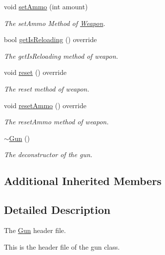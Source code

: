 \begin{DoxyCompactItemize}
\item 
void \hyperlink{class_gun_a32ff9325061ddab247a5d726d8f98207}{set\+Ammo} (int amount)
\begin{DoxyCompactList}\small\item\em The set\+Ammo Method of \hyperlink{class_weapon}{Weapon}. \end{DoxyCompactList}\item 
bool \hyperlink{class_gun_af74d11f4e7f839f4a5842557caeecd64}{get\+Is\+Reloading} () override
\begin{DoxyCompactList}\small\item\em The get\+Is\+Reloading method of weapon. \end{DoxyCompactList}\item 
void \hyperlink{class_gun_adda4a40faac31a145d132ff88002ea20}{reset} () override
\begin{DoxyCompactList}\small\item\em The reset method of weapon. \end{DoxyCompactList}\item 
void \hyperlink{class_gun_aa9b43a5d5d47f8d4c09689fbf4ae84c3}{reset\+Ammo} () override
\begin{DoxyCompactList}\small\item\em The reset\+Ammo method of weapon. \end{DoxyCompactList}\item 
\hyperlink{class_gun_af107f78d608720fef712c14b148afcdd}{$\sim$\+Gun} ()
\begin{DoxyCompactList}\small\item\em The deconstructor of the gun. \end{DoxyCompactList}\end{DoxyCompactItemize}
\subsection*{Additional Inherited Members}


\subsection{Detailed Description}
The \hyperlink{class_gun}{Gun} header file. 

This is the header file of the gun class. 

